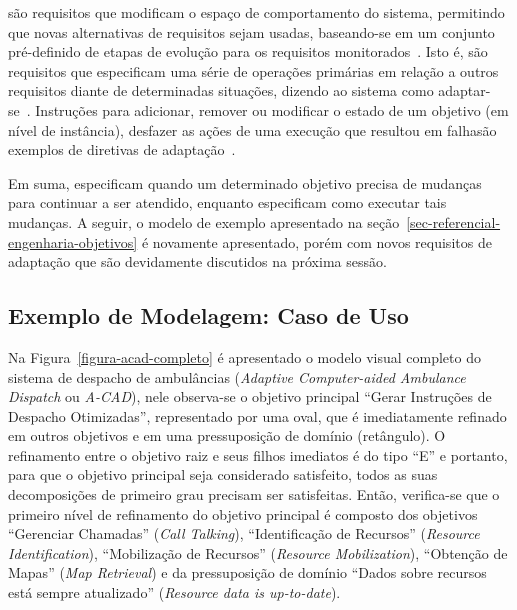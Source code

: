 \evoreqs são requisitos que modificam o espaço de comportamento do sistema, permitindo que novas alternativas de requisitos sejam usadas, baseando-se em um conjunto pré-definido de etapas de evolução para os requisitos monitorados~\cite{souza2012requirement}. Isto é, \evoreqs são requisitos que especificam uma série de operações primárias em relação a outros requisitos diante de determinadas situações, dizendo ao sistema como adaptar-se~\cite{souza2012requirement}. Instruções para adicionar, remover ou modificar o estado de um objetivo (em nível de instância), desfazer as ações de uma execução que resultou em falhasão exemplos de diretivas de adaptação~\cite{souza2013requirements}.

Em suma, \awreqs especificam quando um determinado objetivo precisa de mudanças para continuar a ser atendido, enquanto \evoreqs especificam como executar tais mudanças. A seguir, o modelo de exemplo apresentado na seção~\ref{sec-referencial-engenharia-objetivos} é novamente apresentado, porém com novos requisitos de adaptação que são devidamente discutidos na próxima sessão.

\subsection{Exemplo de Modelagem: Caso de Uso}
\label{sec-referencial-engenharia-objetivos-exemplo}

Na Figura~\ref{figura-acad-completo} é apresentado o modelo visual completo do sistema de despacho de ambulâncias (\textit{Adaptive Computer-aided Ambulance Dispatch} ou \textit{A-CAD}), nele observa-se o objetivo principal ``Gerar Instruções de Despacho Otimizadas'', representado por uma oval, que é imediatamente refinado em outros objetivos e em uma pressuposição de domínio (retângulo). O refinamento entre o objetivo raiz e seus filhos imediatos é do tipo ``E'' e portanto, para que o objetivo principal seja considerado satisfeito, todos as suas decomposições de primeiro grau precisam ser satisfeitas. Então, verifica-se que o primeiro nível de refinamento do objetivo principal é composto dos objetivos ``Gerenciar Chamadas'' (\textit{Call Talking}), ``Identificação de Recursos'' (\textit{Resource Identification}), ``Mobilização de Recursos'' (\textit{Resource Mobilization}), ``Obtenção de Mapas'' (\textit{Map Retrieval}) e da pressuposição de domínio ``Dados sobre recursos está sempre atualizado'' (\textit{Resource data is up-to-date}).

